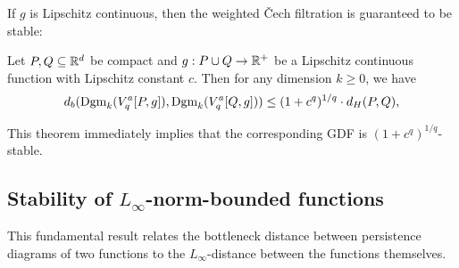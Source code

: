 If $g$ is Lipschitz continuous, then the weighted \v{C}ech filtration is
guaranteed to be stable:
\begin{theorem}
    Let $P, Q \subseteq \mathbb{R}^d$ be compact and $g : P \cup Q \to \mathbb{R}^+$ be a
    Lipschitz continuous function with Lipschitz constant $c$. Then for any
    dimension $k \geq 0$, we have
    \begin{equation}
        d_b(\operatorname{Dgm}_k(V^a_q[P, g]), \operatorname{Dgm}_k(V^a_q[Q, g])) \leq (1 + c^q)^{1/q} \cdot d_H(P, Q),
    \end{equation}
\end{theorem}
This theorem immediately implies that the corresponding GDF
is $(1 + c^q)^{1/q}$-stable.

\subsection{Stability of $L_\infty$-norm-bounded functions}

This fundamental result relates the bottleneck distance between persistence
diagrams of two functions to the $L_\infty$-distance between the functions
themselves.


